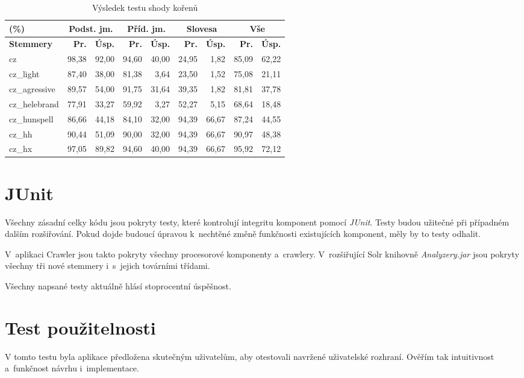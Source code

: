 \begin{table}
\begin{center}
\begin{tabular}{|l|r|r|r|r|r|r|r|r|}
\hline
(\%) & \multicolumn{2}{|c|}{\textbf{Podst. jm.}} & \multicolumn{2}{|c|}{\textbf{Příd. jm.}} & \multicolumn{2}{|c|}{\textbf{Slovesa}} & \multicolumn{2}{|c|}{\textbf{Vše}} \\ \hline
\textbf{Stemmery} & \textbf{Pr.} & \textbf{Úsp.} & \textbf{Pr.} & \textbf{Úsp.} & \textbf{Pr.} & \textbf{Úsp.} & \textbf{Pr.} & \textbf{Úsp.} \\ \hline
cz & 98,38 & 92,00 & 94,60 & 40,00 & 24,95 & 1,82 & 85,09 & 62,22 \\ \hline
cz\_light & 87,40 & 38,00 & 81,38 & 3,64 & 23,50 & 1,52 & 75,08 & 21,11 \\ \hline
cz\_agressive & 89,57 & 54,00 & 91,75 & 31,64 & 39,35 & 1,82 & 81,81 & 37,78 \\ \hline
cz\_helebrand & 77,91 & 33,27 & 59,92 & 3,27 & 52,27 & 5,15 & 68,64 & 18,48 \\ \hline
cz\_hunspell & 86,66 & 44,18 & 84,10 & 32,00 & 94,39 & 66,67 & 87,24 & 44,55 \\ \hline
\hline
cz\_hh & 90,44 & 51,09 & 90,00 & 32,00 & 94,39 & 66,67 & 90,97 & 48,38 \\ \hline
cz\_hx & 97,05 & 89,82 & 94,60 & 40,00 & 94,39 & 66,67 & 95,92 & 72,12 \\ \hline
\end{tabular}
\end{center}
\caption{Výsledek testu shody kořenů}
\label{tab:test_eql}
\end{table}

\section{JUnit}
Všechny zásadní celky kódu jsou pokryty testy, které kontrolují integritu komponent pomocí \emph{JUnit}. Testy budou užitečné při případném dalším rozšiřování. Pokud dojde budoucí úpravou k~nechtěné změně funkčnosti existujících komponent, měly by to testy odhalit.

V~aplikaci Crawler jsou takto pokryty všechny procesorové komponenty a~crawlery. V~rozšiřující Solr knihovně \emph{Analyzery.jar} jsou pokryty všechny tři nové stemmery i~s~jejich továrními třídami.

Všechny napsané testy aktuálně hlásí stoprocentní úspěšnost.

\section{Test použitelnosti}
V tomto testu byla aplikace předložena skutečným uživatelům, aby otestovali navržené uživatelské rozhraní. Ověřím tak intuitivnost a~funkčnost návrhu i~implementace.

